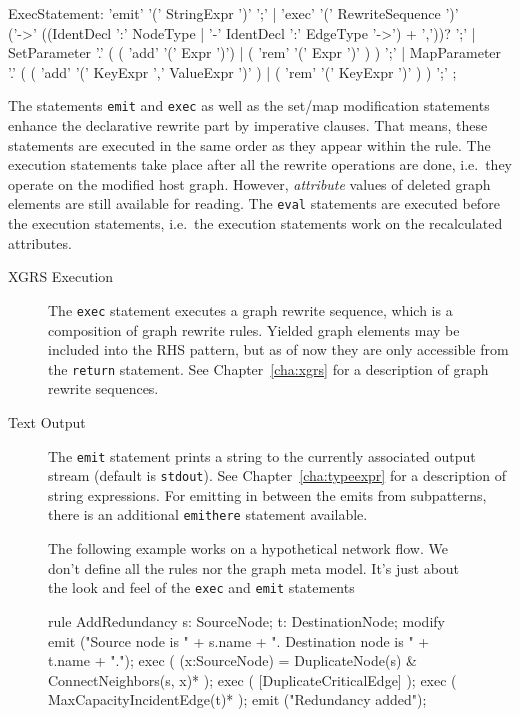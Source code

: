 \begin{rail}  
  ExecStatement: 'emit' '(' StringExpr ')' ';' |
    'exec' '(' RewriteSequence ')' \\ ('->' ((IdentDecl ':' NodeType | '-' IdentDecl ':' EdgeType '->') + ','))? ';' |
	SetParameter '.' ( ( 'add' '(' Expr ')') | ( 'rem' '(' Expr ')' ) ) ';' |
	MapParameter '.' ( ( 'add' '(' KeyExpr ',' ValueExpr ')' ) | ( 'rem' '(' KeyExpr ')' ) ) ';'
	;
\end{rail}
The statements \texttt{emit} and \texttt{exec} as well as the set/map modification statements enhance the declarative rewrite part by imperative clauses.
That means, these statements are executed in the same order as they appear within the rule.
The execution statements take place after all the rewrite operations are done, i.e.\ they operate on the modified host graph.
However, \emph{attribute} values of deleted graph elements are still available for reading.
The \texttt{eval} statements are executed before the execution statements, i.e.\ the execution statements work on the recalculated attributes.
\begin{description}
  \item[XGRS Execution] The \texttt{exec} statement executes a graph rewrite sequence, which is a composition of graph rewrite rules. Yielded graph elements may be included into the RHS pattern, but as of now they are only accessible from the \texttt{return} statement. See Chapter~\ref{cha:xgrs} for a description of graph rewrite sequences.
  \item[Text Output] The \texttt{emit} statement prints a string to the currently associated output stream (default is \texttt{stdout}). See Chapter~\ref{cha:typeexpr} for a description of string expressions.
  For emitting in between the emits from subpatterns, there is an additional \texttt{emithere} statement available.
\end{description}

\begin{figure}[htbp]
\begin{example}
	The following example works on a hypothetical network flow.
	We don't define all the rules nor the graph meta model.
	It's just about the look and feel of the \texttt{exec} and \texttt{emit} statements
	\begin{grgen}
rule AddRedundancy
{
  s: SourceNode;
  t: DestinationNode;	
  modify {
    emit ("Source node is " + s.name + ". Destination node is " + t.name + ".");
    exec ( (x:SourceNode) = DuplicateNode(s) & ConnectNeighbors(s, x)* );
    exec ( [DuplicateCriticalEdge] );
    exec ( MaxCapacityIncidentEdge(t)* );
    emit ("Redundancy added");
  }
}  
	\end{grgen}
\end{example}
\end{figure}

